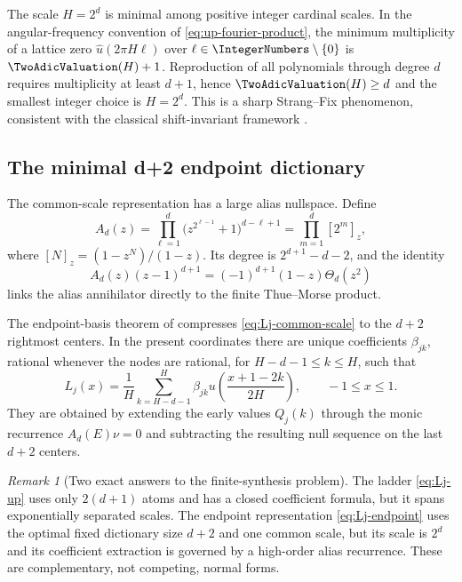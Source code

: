 \documentclass[11pt,oneside]{article}
\theoremstyle{definition}
\theoremstyle{remark}
\newtheorem{remark}[theorem]{Remark}
\begin{document}
The scale $H=2^d$ is minimal among positive integer cardinal scales.  In the
angular-frequency convention of \eqref{eq:up-fourier-product}, the minimum
multiplicity of a lattice zero $\widehat u(2\pi H\ell)$ over
$\ell\in\IntegerNumbers\setminus\{0\}$ is $\TwoAdicValuation(H)+1$.  Reproduction of all polynomials
through degree $d$ requires multiplicity at least $d+1$, hence
$\TwoAdicValuation(H)\ge d$ and the smallest integer choice is $H=2^d$.  This is a sharp
Strang--Fix phenomenon, consistent with the classical shift-invariant
framework \cite{deBoorDeVoreRon1994,Zakharov2020}.

\subsection{The minimal d+2 endpoint dictionary}
The common-scale representation has a large alias nullspace.  Define
\begin{equation}
 A_d(z)=\prod_{\ell=1}^{d}
 \bigl(z^{2^{\ell-1}}+1\bigr)^{d-\ell+1}
 =\prod_{m=1}^{d}[2^m]_z,
 \label{eq:Ad}
\end{equation}
where $[N]_z=(1-z^N)/(1-z)$.  Its degree is
$2^{d+1}-d-2$, and the identity
\begin{equation}
 A_d(z)(z-1)^{d+1}
 =(-1)^{d+1}(1-z)\Theta_d(z^2)
 \label{eq:Ad-TM}
\end{equation}
links the alias annihilator directly to the finite Thue--Morse product.

The endpoint-basis theorem of \cite{UpPolynomialSynthesis} compresses
\eqref{eq:Lj-common-scale} to the $d+2$ rightmost centers.  In the present
coordinates there are unique coefficients $\beta_{jk}$, rational whenever
the nodes are rational, for $H-d-1\le k\le H$, such that
\begin{equation}
 \boxed{
 L_j(x)=\frac1H\sum_{k=H-d-1}^{H}\beta_{jk}
 u\!\left(\frac{x+1-2k}{2H}\right),
 \qquad -1\le x\le1.}
 \label{eq:Lj-endpoint}
\end{equation}
They are obtained by extending the early values $Q_j(k)$ through the monic
recurrence $A_d(E)\nu=0$ and subtracting the resulting null sequence on the
last $d+2$ centers.

\begin{remark}[Two exact answers to the finite-synthesis problem]
The ladder \eqref{eq:Lj-up} uses only $2(d+1)$ atoms and has a closed
coefficient formula, but it spans exponentially separated scales.  The
endpoint representation \eqref{eq:Lj-endpoint} uses the optimal fixed
dictionary size $d+2$ and one common scale, but its scale is $2^d$ and its
coefficient extraction is governed by a high-order alias recurrence.  These
are complementary, not competing, normal forms.
\end{remark}
\end{document}
